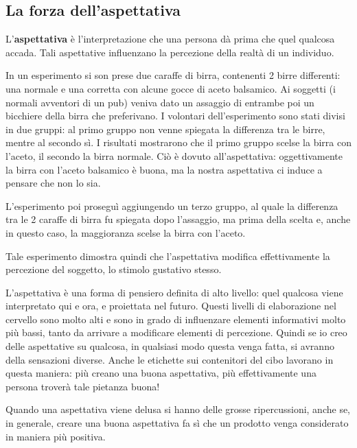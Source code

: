 \subsection{La forza dell'aspettativa}

\begin{definition}[Aspettativa]
L'\textbf{aspettativa} è l'interpretazione che una persona dà prima che quel 
qualcosa accada. Tali aspettative influenzano la percezione della realtà di un 
individuo. 
\end{definition}

\begin{example}
In un esperimento si son prese due caraffe di birra, contenenti 2 birre
differenti: una normale e una corretta con alcune gocce di aceto balsamico.
Ai soggetti (i normali avventori di un pub) veniva dato un assaggio di entrambe
poi un bicchiere della birra che preferivano.
I volontari dell'esperimento sono stati divisi in due gruppi: al primo gruppo
non venne spiegata la differenza tra le birre, mentre al secondo sì. I
risultati mostrarono che il primo gruppo scelse la birra con l'aceto, il
secondo la birra normale. Ciò è dovuto all'aspettativa: oggettivamente la birra
con l'aceto balsamico è buona, ma la nostra aspettativa ci induce a pensare che
non lo sia.

L'esperimento poi proseguì aggiungendo un terzo gruppo, al quale la
differenza tra le 2 caraffe di birra fu spiegata dopo l'assaggio, ma
prima della scelta e, anche in questo caso, la maggioranza scelse la birra
con l'aceto.

Tale esperimento dimostra quindi che l'aspettativa modifica
effettivamente la percezione del soggetto, lo stimolo gustativo stesso. 
\end{example}

L'aspettativa è una forma di pensiero definita di alto livello: quel qualcosa
viene interpretato qui e ora, e proiettata nel futuro. Questi livelli di
elaborazione nel cervello sono molto alti e sono in grado di influenzare
elementi informativi molto più bassi, tanto da arrivare a modificare elementi 
di percezione. Quindi se io creo delle aspettative su qualcosa, in qualsiasi 
modo questa venga fatta, si avranno della sensazioni diverse. Anche le 
etichette sui contenitori del cibo lavorano in questa maniera: più creano una 
buona aspettativa, più effettivamente una persona troverà tale pietanza buona!

Quando una aspettativa viene delusa si hanno delle grosse ripercussioni, anche
se, in generale, creare una buona aspettativa fa sì che un prodotto venga
considerato in maniera più positiva.

